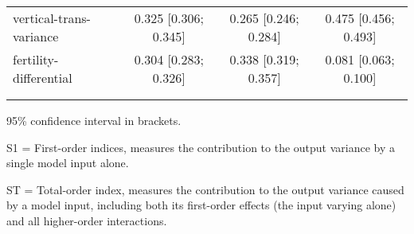 \begin{table}[htp]
\begin{threeparttable}
\begin{tabular}{lccc}
	  \hspace{1.5em} vertical-trans-variance & 0.325 [0.306; 0.345]   & 0.265 [0.246; 0.284]   & 0.475 [0.456; 0.493] \\
	  \hspace{1.5em} fertility-differential & 0.304 [0.283; 0.326]   & 0.338 [0.319; 0.357]   & 0.081 [0.063; 0.100] \\
	 \\
\addlinespace
\hline
\end{tabular}
\begin{tablenotes}
\scriptsize
\item 95\% confidence interval in brackets.
\item S1 = First-order indices,  measures the contribution to the output variance by a single model input alone.
\item ST = Total-order index, measures the contribution to the output variance caused by a model input, including both its first-order effects (the input varying alone) and all higher-order interactions.
\end{tablenotes}
\end{threeparttable}
\end{table}